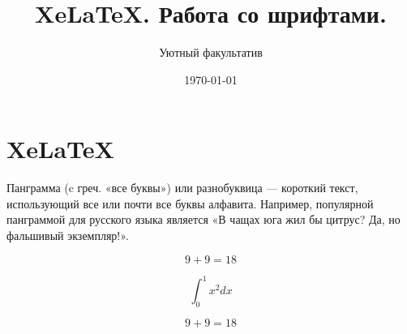 \documentclass[12pt, a4paper]{article}
\author{Уютный факультатив}
\title{Xe\LaTeX. Работа со шрифтами.}
\date{\today}
\begin{document}
\maketitle


\section{Xe\LaTeX}

Панграмма (c греч. «все буквы») или разнобуквица — короткий текст, использующий все или почти все буквы алфавита. Например, популярной панграммой для русского языка является «В чащах юга жил бы цитрус? Да, но фальшивый экземпляр!».


{\Large  {}}

\[ 9 + 9 = 18 \] 


 \[ \int_{0}^{1} x^2 dx  \] 
 
\[ 9 + 9 = 18 \] 
\end{document}
